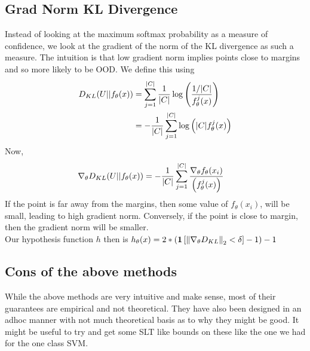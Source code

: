 \documentclass[11pt]{report}
\begin{document}
\subsection{Grad Norm KL Divergence}
Instead of looking at the maximum softmax probability as a measure of confidence, we look at the gradient of the norm of the KL divergence as such a measure. The intuition is that low gradient norm implies points close to margins and so more likely to be OOD. We define this using
\begin{align}
    \begin{aligned}
        D_{KL}(U || f_\theta(x)) &= \sum_{j=1}^{|C|} \frac{1}{|C|} \log \left( \frac{1/|C|}{f_\theta^j(x)} \right)\\
        &= - \frac{1}{|C|} \sum_{j=1}^{|C|}  \log \left( |C|f_\theta^j(x) \right)
    \end{aligned} \nonumber
\end{align}
Now, 
\begin{align}
    \begin{aligned}
        \nabla_\theta D_{KL}(U || f_\theta(x))  &= - \frac{1}{|C|} \sum_{j=1}^{|C|}  \frac{\nabla_\theta f_\theta(x_i)}{\left(f_\theta^j(x) \right)}
    \end{aligned} \nonumber
\end{align}
If the point is far away from the margins, then some value of \(f_\theta(x_i)\), will be small, leading to high gradient norm. Conversely, if the point is close to margin, then the gradient norm will be smaller.\\
Our hypothesis function \(h\) then is \(h_\theta(x)= 2 * \left( \mathbf{1} \left[ \left\lVert \nabla_\theta D_{KL} \right\rVert_2 < \delta \right] - 1 \right) -1 \)


 

\subsection{Cons of the above methods}
    While the above methods are very intuitive and make sense, most of their guarantees are empirical and not theoretical. They have also been designed in an adhoc manner with not much theoretical basis as to why they might be good. It might be useful to try and get some SLT like bounds on these like the one we had for the one class SVM.
% 
% 
\end{document}
